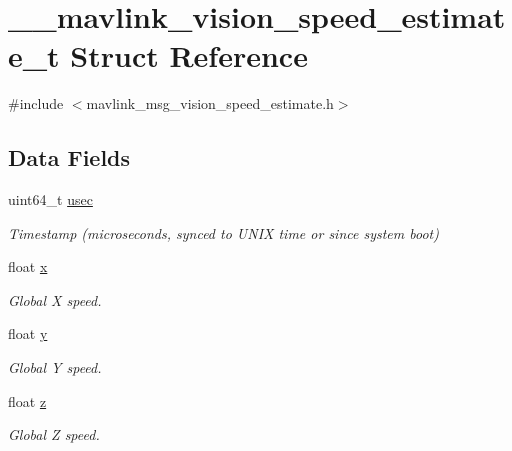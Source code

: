 \hypertarget{struct____mavlink__vision__speed__estimate__t}{\section{\+\_\+\+\_\+mavlink\+\_\+vision\+\_\+speed\+\_\+estimate\+\_\+t Struct Reference}
\label{struct____mavlink__vision__speed__estimate__t}
}


{\ttfamily \#include $<$mavlink\+\_\+msg\+\_\+vision\+\_\+speed\+\_\+estimate.\+h$>$}

\subsection*{Data Fields}
\begin{DoxyCompactItemize}
\item 
uint64\+\_\+t \hyperlink{struct____mavlink__vision__speed__estimate__t_adfc952857e519d31dfaa6f3cdd153843}{usec}
\begin{DoxyCompactList}\small\item\em Timestamp (microseconds, synced to U\+N\+I\+X time or since system boot) \end{DoxyCompactList}\item 
float \hyperlink{struct____mavlink__vision__speed__estimate__t_a8fcd91c8bacb70d5b1bd6df87fb01a5a}{x}
\begin{DoxyCompactList}\small\item\em Global X speed. \end{DoxyCompactList}\item 
float \hyperlink{struct____mavlink__vision__speed__estimate__t_ae2bcf3949b4e0ac7d21b4bc886fea08c}{y}
\begin{DoxyCompactList}\small\item\em Global Y speed. \end{DoxyCompactList}\item 
float \hyperlink{struct____mavlink__vision__speed__estimate__t_a019d0fa1a28f8c96b0092c9c47ced03d}{z}
\begin{DoxyCompactList}\small\item\em Global Z speed. \end{DoxyCompactList}\end{DoxyCompactItemize}


